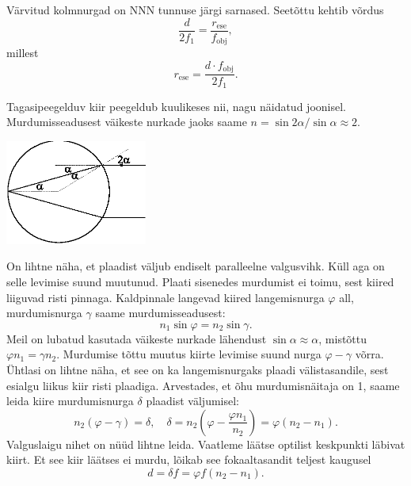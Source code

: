 \documentclass[10pt]{article}
\begin{document}
{Värvitud kolmnurgad on NNN tunnuse järgi sarnased. Seetõttu kehtib võrdus
\[
\frac{d}{2f_1}=\frac{r_{\mathrm{ese}}}{f_{\mathrm{obj}}},
\]
millest
\[
r_{\mathrm{ese}}=\frac{d\cdot f_{\mathrm{obj}}}{2f_1}.
\]
\probend
\bigskip


\solu
Tagasipeegelduv kiir peegeldub kuulikeses nii, nagu näidatud joonisel. Murdumisseadusest väikeste nurkade jaoks saame
$n=\sin 2\alpha/\sin\alpha \approx 2.$
\begin{center}
	\includegraphics[width=0.35\textwidth]{2010-lahg-04-kuulike.eps}
\end{center}
\probend
\bigskip


\solu
On lihtne näha, et plaadist väljub endiselt paralleelne valgusvihk. Küll aga on selle levimise suund muutunud. Plaati sisenedes murdumist ei toimu, sest kiired liiguvad risti pinnaga. Kaldpinnale langevad kiired langemisnurga $\varphi$ all, murdumisnurga $\gamma$ saame murdumisseadusest:
\[
n_1 \sin \varphi = n_2 \sin \gamma.
\]
Meil on lubatud kasutada väikeste nurkade lähendust $\sin \alpha \approx \alpha$, mistõttu $\varphi n_1 = \gamma n_2$. Murdumise tõttu muutus kiirte levimise suund nurga $\varphi -\gamma$ võrra. Ühtlasi on lihtne näha, et see on ka langemisnurgaks plaadi välistasandile, sest esialgu liikus kiir risti plaadiga. Arvestades, et õhu murdumisnäitaja on 1, saame leida kiire murdumisnurga $\delta$ plaadist väljumisel:
\[
n_{2}(\varphi-\gamma)=\delta, \quad \delta=n_{2}\left(\varphi-\frac{\varphi n_{1}}{n_{2}}\right)=\varphi\left(n_{2}-n_{1}\right).
\]
Valguslaigu nihet on nüüd lihtne leida. Vaatleme läätse optilist keskpunkti
läbivat kiirt. Et see kiir läätses ei murdu, lõikab see fokaaltasandit teljest kaugusel
\[
d = \delta f = \varphi f (n_2 - n_1).
\]
\probend
\bigskip


}
\end{document}
